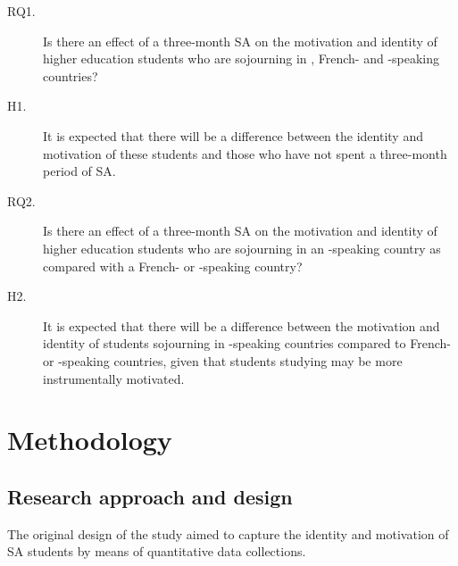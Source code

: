\documentclass[output=paper]{langsci/langscibook}
\begin{document}
\begin{description}
 \item[RQ1.] Is there an effect of a three-month SA on the motivation and identity of higher education students who are sojourning in , French- and -speaking countries? 
 \item[H1.] It is expected that there will be a difference between the identity and motivation of these students and those who have not spent a three-month period of SA.

 \item[RQ2.] Is there an effect of a three-month SA on the motivation and identity of higher education students who are sojourning in an -speaking country as compared with a French- or -speaking country? 

 \item[H2.] It is expected that there will be a difference between the motivation and identity of students sojourning in -speaking countries compared to French- or -speaking countries, given that students studying  may be more instrumentally motivated. 

\end{description}




\section{Methodology}

\subsection{Research approach and design}


The original design of the study aimed to capture the identity and motivation of SA students by means of quantitative data collections.
\end{document}
